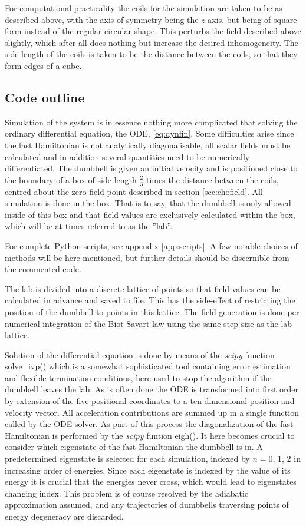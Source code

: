 \documentclass[main.tex]{subfiles}
\begin{document}
For computational practicality the coils for the simulation are taken to be as described
above, with the axis of symmetry being the \(z\)-axis, but being of square form instead of
the regular circular shape. This perturbs the field described above slightly, which after
all does nothing but increase the desired inhomogeneity. The side length of the coils is
taken to be the distance between the coils, so that they form edges of a cube.

\subsection{Code outline}\label{sec:code}
Simulation of the system is in essence nothing more complicated that solving the
ordinary differential equation, the ODE, \ref{eq:dynfin}. Some difficulties arise since the fast
Hamiltonian is not analytically diagonalisable, all scalar fields must be calculated and in
addition several quantities need to be numerically differentiated. The dumbbell is given an
initial velocity and is positioned close to the boundary of a box of side length \(\frac{2}{3}\) times the
distance between the coils, centred about the zero-field point described in section
\ref{sec:chofield}. All simulation is done in the box. That is to say, that the dumbbell is
only allowed inside of this box and that field values are exclusively calculated within the
box, which will be at times referred to as the ''lab''.

For complete Python scripts, see appendix \ref{app:scripts}. A few notable choices of
methods will be here mentioned, but further details should be discernible from the
commented code.

The lab is divided into a discrete lattice of points so that field values can be
calculated in advance and saved to file. This has the side-effect of restricting the
position of the dumbbell to points in this lattice. The field generation is done per numerical
integration of the Biot-Savart law using the same step size as the lab lattice.

Solution of the differential equation is done by means of the \textit{scipy} function
solve\_ivp() which is a somewhat sophisticated tool containing error estimation and
flexible termination conditions, here used to stop the algorithm if the dumbbell leaves the
lab. As is often done the ODE is transformed into first order by extension of the
five positional coordinates to a ten-dimensional position and velocity vector. All
acceleration contributions are summed up in a single function called by the ODE solver. 
As part of this process the diagonalization of the fast Hamiltonian is performed by the
\textit{scipy} funtion eigh(). It here becomes crucial to consider which eigenstate of the
fast Hamiltonian the dumbbell is in. A predetermined eigenstate is selected for each
simulation, indexed by \(n = 0\), \(1\), \(2\) in increasing order of energies. Since each
eigenstate is indexed by the value of its energy it is crucial that the energies never
cross, which would lead to eigenstates changing index. This problem is of course resolved
by the adiabatic approximation assumed, and any trajectories of dumbbells traversing points
of energy degeneracy are discarded.
\end{document}
